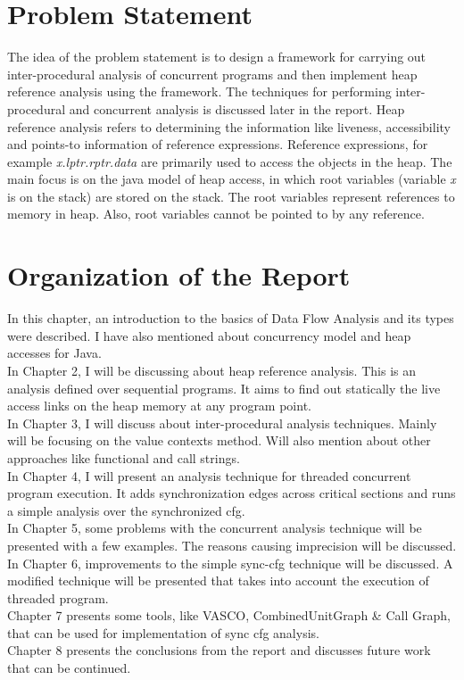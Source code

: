 \section{Problem Statement}  

The idea of the problem statement is to design a framework for carrying out inter-procedural analysis of concurrent programs and then implement heap reference analysis using the framework. The techniques for performing inter-procedural and concurrent analysis is discussed later in the report. Heap reference analysis refers to determining the information like liveness, accessibility and points-to information of reference expressions. Reference expressions, for example \emph{x.lptr.rptr.data} are primarily used to access the objects in the heap. The main focus is on the java model of heap access, in which root variables (variable \emph{x} is on the stack) are stored on the stack. The root variables represent references to memory in heap. Also, root variables cannot be pointed to by any reference.  
 
\section{Organization of the Report}

In this chapter, an introduction to the basics of Data Flow Analysis and its types were described. I have also mentioned about concurrency model and heap accesses for Java. \\

In Chapter 2, I will be discussing about heap reference analysis. This is an analysis defined over sequential programs. It aims to find out statically the live access links on the heap memory at any program  point. \\

In Chapter 3, I will discuss about inter-procedural analysis techniques. Mainly will be focusing on the value contexts method. Will also mention about other approaches like functional and call strings. \\

In Chapter 4, I will present an analysis technique for threaded concurrent program execution. It adds synchronization edges across critical sections and runs a simple analysis over the synchronized cfg. \\

In Chapter 5, some problems with the concurrent analysis technique will be presented with  a few examples. The reasons causing imprecision will be discussed. \\

In Chapter 6, improvements to the simple sync-cfg technique will be discussed. A modified technique will be presented that takes into account the execution of threaded program. \\

Chapter 7 presents some tools, like VASCO, CombinedUnitGraph \& Call Graph, that can be used for implementation of sync cfg analysis. \\

Chapter 8 presents the conclusions from the report and discusses future work that can be continued. \\


  
 